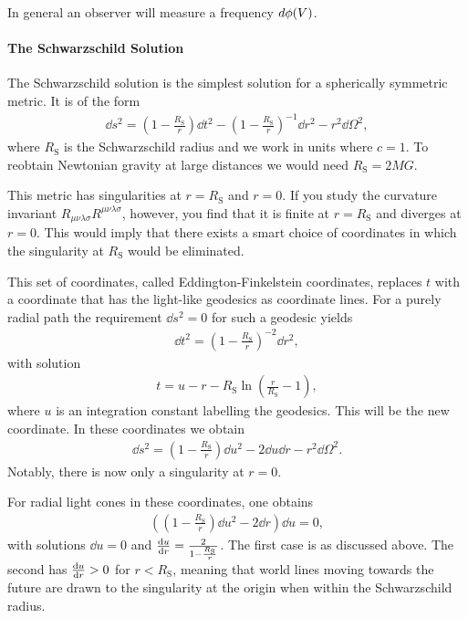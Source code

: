 In general an observer will measure a frequency $d\phi(V)$.

\paragraph{The Schwarzschild Solution}
The Schwarzschild solution is the simplest solution for a spherically symmetric metric. It is of the form
\begin{align*}
	\dd{s}^{2} = \left(1 - \frac{R_{\text{S}}}{r}\right)\dd{t}^{2} - \left(1 - \frac{R_{\text{S}}}{r}\right)^{-1}\dd{r}^{2} - r^{2}\dd{\Omega}^{2},
\end{align*}
where $R_{\text{S}}$ is the Schwarzschild radius and we work in units where $c = 1$. To reobtain Newtonian gravity at large distances we would need $R_{\text{S}} = 2MG$.

This metric has singularities at $r = R_{\text{S}}$ and $r = 0$. If you study the curvature invariant $R_{\mu\nu\lambda\sigma}R^{\mu\nu\lambda\sigma}$, however, you find that it is finite at $r = R_{\text{S}}$ and diverges at $r = 0$. This would imply that there exists a smart choice of coordinates in which the singularity at $R_{\text{S}}$ would be eliminated.

This set of coordinates, called Eddington-Finkelstein coordinates, replaces $t$ with a coordinate that has the light-like geodesics as coordinate lines. For a purely radial path the requirement $\dd{s}^{2} = 0$ for such a geodesic yields
\begin{align*}
	\dd{t}^{2} = \left(1 - \frac{R_{\text{S}}}{r}\right)^{-2}\dd{r}^{2},
\end{align*}
with solution
\begin{align*}
	t = u - r - R_{\text{S}}\ln(\frac{r}{R_{\text{S}}} - 1),
\end{align*}
where $u$ is an integration constant labelling the geodesics. This will be the new coordinate. In these coordinates we obtain
\begin{align*}
	\dd{s}^{2} = \left(1 - \frac{R_{\text{S}}}{r}\right)\dd{u}^{2} - 2\dd{u}\dd{r} - r^{2}\dd{\Omega}^{2}.
\end{align*}
Notably, there is now only a singularity at $r = 0$.

For radial light cones in these coordinates, one obtains
\begin{align*}
	\left(\left(1 - \frac{R_{\text{S}}}{r}\right)\dd{u}^{2} - 2\dd{r}\right)\dd{u} = 0,
\end{align*}
with solutions $\dd{u} = 0$ and $\dv{u}{r} = \frac{2}{1 - \frac{R_{\text{S}}}{r}}$. The first case is as discussed above. The second has $\dv{u}{r} > 0$ for $r < R_{\text{S}}$, meaning that world lines moving towards the future are drawn to the singularity at the origin when within the Schwarzschild radius.

